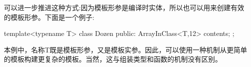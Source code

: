 可以进一步推进这种方式:因为模板形参是编译时实体，所以也可以用来创建有效的模板形参。下面是一个例子:

\begin{cpp}
template<typename T>
class Dozen {
	public:
	ArrayInClass<T,12> contents;
};
\end{cpp}

本例中，名称T既是模板形参，又是模板实参。因此，可以使用一种机制从更简单的模板构建更复杂的模板。当然，这与组装类型和函数的机制没有区别。


























